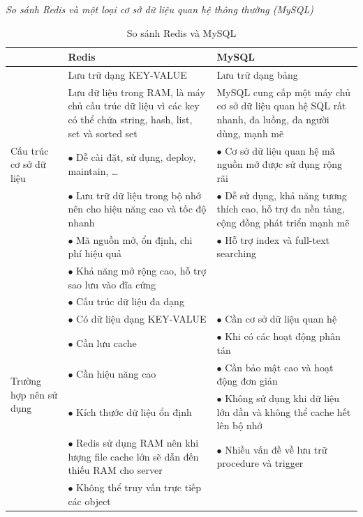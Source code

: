 \textit{So sánh Redis và một loại cơ sở dữ liệu quan hệ thông thường (MySQL)}
\begin{table}[H]
\centering
\begin{tabular}{| m{3cm} | m{6cm} | m{6cm} |}
\hline
& \textbf{Redis} & \textbf{MySQL} \\ 

\hline
\multirow{5}{3cm}{Cấu trúc cơ sở dữ liệu} &
Lưu trữ dạng KEY-VALUE & Lưu trữ dạng bảng \\  
\cline{2-3}
& Lưu dữ liệu trong RAM, là máy chủ cấu trúc dữ
liệu vì các key có thể chứa string, hash, list,
set và sorted set
& MySQL cung cấp một máy chủ cơ sở dữ liệu quan hệ SQL
rất nhanh, đa luồng, đa người dùng, mạnh mẽ \\  

\hline
\multirow{9}{3cm}{Ưu điểm}
& $\bullet$ Dễ cài đặt, sử dụng, deploy, maintain, … & 
$\bullet$ Cơ sở dữ liệu quan hệ mã nguồn mở được sử dụng rộng rãi \\
& $\bullet$ Lưu trữ dữ liệu trong bộ nhớ nên cho hiệu
    năng cao và tốc độ nhanh &
$\bullet$ Dễ sử dụng, khả năng tương thích cao, hỗ trợ đa nền tảng,
cộng đồng phát triển mạnh mẽ \\
& $\bullet$ Mã nguồn mở, ổn định, chi phí hiệu quả &
$\bullet$ Hỗ trợ index và full-text searching \\
& $\bullet$ Khả năng mở rộng cao, hỗ trợ sao lưu vào đĩa cứng & \\
& $\bullet$ Cấu trúc dữ liệu đa dạng & \\
\hline
\multirow{5}{3cm}{Trường hợp nên sử dụng} & 
$\bullet$ Có dữ liệu dạng KEY-VALUE & $\bullet$ Cần cơ sở dữ liệu quan hệ \\
& $\bullet$ Cần lưu cache & $\bullet$ Khi có các hoạt động phân tán \\
& $\bullet$ Cần hiệu năng cao &
$\bullet$ Cần bảo mật cao và hoạt động đơn giản \\
& $\bullet$ Kích thước dữ liệu ổn định &
$\bullet$ Không sử dụng khi dữ liệu lớn dần và 
không thể cache hết lên bộ nhớ \\
\hline
\multirow{3}{3cm}{Nhược điểm} & 
$\bullet$ Redis sử dụng RAM nên khi lượng file cache lớn sẽ
dẫn đến thiếu RAM cho server &
$\bullet$ Nhiều vấn đề về lưu trữ procedure và trigger \\
& $\bullet$ Không thể truy vấn trực tiếp các object & \\
\hline
\end{tabular}
\caption{So sánh Redis và MySQL}
\end{table}
